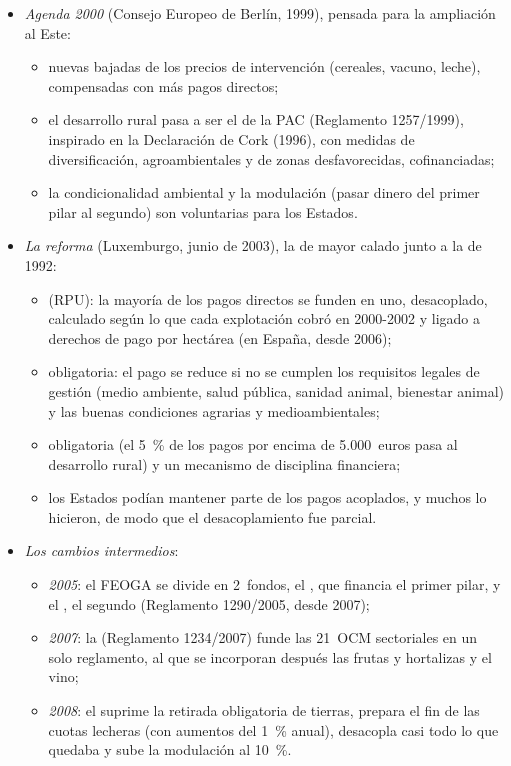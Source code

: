 \documentclass[11pt]{article}
\begin{document}
\begin{itemize}
\item \emph{Agenda 2000} (Consejo Europeo de Berlín, 1999), pensada para la ampliación al Este:
  \begin{itemize}
  \item nuevas bajadas de los precios de intervención (cereales, vacuno, leche), compensadas con más pagos directos;
  \item el desarrollo rural pasa a ser el  de la PAC (Reglamento 1257/1999), inspirado en la Declaración de Cork (1996), con medidas de diversificación, agroambientales y de zonas desfavorecidas, cofinanciadas;
  \item la condicionalidad ambiental y la modulación (pasar dinero del primer pilar al segundo) son voluntarias para los Estados.
  \end{itemize}
\item \emph{La reforma } (Luxemburgo, junio de 2003), la de mayor calado junto a la de 1992:
  \begin{itemize}
  \item {} (RPU): la mayoría de los pagos directos se funden en uno, desacoplado, calculado según lo que cada explotación cobró en 2000-2002 y ligado a derechos de pago por hectárea (en España, desde 2006);
  \item {} obligatoria: el pago se reduce si no se cumplen los requisitos legales de gestión (medio ambiente, salud pública, sanidad animal, bienestar animal) y las buenas condiciones agrarias y medioambientales;
  \item {} obligatoria (el 5~\% de los pagos por encima de 5.000~euros pasa al desarrollo rural) y un mecanismo de disciplina financiera;
  \item los Estados podían mantener parte de los pagos acoplados, y muchos lo hicieron, de modo que el desacoplamiento fue parcial.
  \end{itemize}
\item \emph{Los cambios intermedios}:
  \begin{itemize}
  \item \emph{2005}: el FEOGA se divide en 2~fondos, el , que financia el primer pilar, y el , el segundo (Reglamento 1290/2005, desde 2007);
  \item \emph{2007}: la  (Reglamento 1234/2007) funde las 21~OCM sectoriales en un solo reglamento, al que se incorporan después las frutas y hortalizas y el vino;
  \item \emph{2008}: el  suprime la retirada obligatoria de tierras, prepara el fin de las cuotas lecheras (con aumentos del 1~\% anual), desacopla casi todo lo que quedaba y sube la modulación al 10~\%.
  \end{itemize}
\end{itemize}
\end{document}
